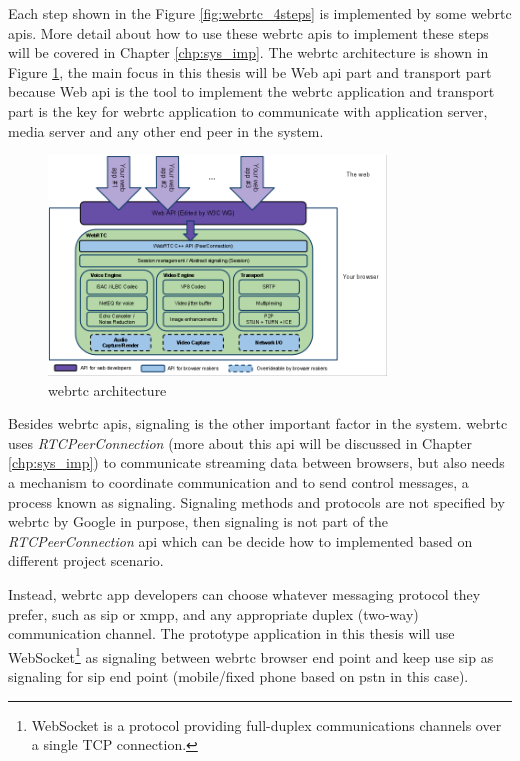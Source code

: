 \par Each step shown in the Figure \ref{fig:webrtc_4steps} is implemented by some \gls{webrtc} \gls{api}s. More detail about how to use these \gls{webrtc} \gls{api}s to implement these steps will be covered in Chapter \ref{chp:sys_imp}. The \gls{webrtc} architecture is shown in Figure \ref{fig:webrtc_api_arch}, the main focus in this thesis will be Web \gls{api} part and transport part because Web \gls{api} is the tool to implement the \gls{webrtc} application and transport part is the key for \gls{webrtc} application to communicate with application server, media server and any other end peer in the system. 

\begin{figure}
	\centering
    	\includegraphics[width=0.80\textwidth,natwidth=610,natheight=642]{figs/WebRTCapiPic.png}
  	\caption{\gls{webrtc} architecture \cite{org:webrtc}}
  	\label{fig:webrtc_api_arch}
\end{figure}

\par Besides \gls{webrtc} \gls{api}s, signaling is the other important factor in the system. \gls{webrtc} uses \textit{RTCPeerConnection} (more about this \gls{api} will be discussed in Chapter \ref{chp:sys_imp}) to communicate streaming data between browsers, but also needs a mechanism to coordinate communication and to send control messages, a process known as signaling. Signaling methods and protocols are not specified by \gls{webrtc} by Google in purpose, then signaling is not part of the \textit{RTCPeerConnection} \gls{api} which can be decide how to implemented based on different project scenario.

\par Instead, \gls{webrtc} app developers can choose whatever messaging protocol they prefer, such as \gls{sip} or \gls{xmpp}, and any appropriate duplex (two-way) communication channel. The prototype application in this thesis will use WebSocket\footnote{WebSocket is a protocol providing full-duplex communications channels over a single TCP connection.\cite{wiki:websocket}} as signaling between \gls{webrtc} browser end point and keep use \gls{sip} as signaling for \gls{sip} end point (mobile/fixed phone based on \gls{pstn} in this case).

